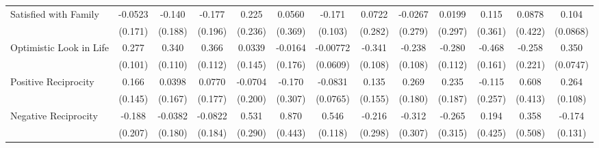 {\begin{tabular}{l*{12}{c}}
\addlinespace
Satisfied with Family&     -0.0523         &      -0.140         &      -0.177         &       0.225         &      0.0560         &      -0.171         &      0.0722         &     -0.0267         &      0.0199         &       0.115         &      0.0878         &       0.104         \\
            &     (0.171)         &     (0.188)         &     (0.196)         &     (0.236)         &     (0.369)         &     (0.103)         &     (0.282)         &     (0.279)         &     (0.297)         &     (0.361)         &     (0.422)         &    (0.0868)         \\
\addlinespace
Optimistic Look in Life&       0.277\sym{**} &       0.340\sym{**} &       0.366\sym{**} &      0.0339         &     -0.0164         &    -0.00772         &      -0.341\sym{**} &      -0.238\sym{*}  &      -0.280\sym{*}  &      -0.468\sym{**} &      -0.258         &       0.350\sym{***}\\
            &     (0.101)         &     (0.110)         &     (0.112)         &     (0.145)         &     (0.176)         &    (0.0609)         &     (0.108)         &     (0.108)         &     (0.112)         &     (0.161)         &     (0.221)         &    (0.0747)         \\
\addlinespace
Positive Reciprocity&       0.166         &      0.0398         &      0.0770         &     -0.0704         &      -0.170         &     -0.0831         &       0.135         &       0.269         &       0.235         &      -0.115         &       0.608         &       0.264\sym{*}  \\
            &     (0.145)         &     (0.167)         &     (0.177)         &     (0.200)         &     (0.307)         &    (0.0765)         &     (0.155)         &     (0.180)         &     (0.187)         &     (0.257)         &     (0.413)         &     (0.108)         \\
\addlinespace
Negative Reciprocity&      -0.188         &     -0.0382         &     -0.0822         &       0.531         &       0.870\sym{*}  &       0.546\sym{***}&      -0.216         &      -0.312         &      -0.265         &       0.194         &       0.358         &      -0.174         \\
            &     (0.207)         &     (0.180)         &     (0.184)         &     (0.290)         &     (0.443)         &     (0.118)         &     (0.298)         &     (0.307)         &     (0.315)         &     (0.425)         &     (0.508)         &     (0.131)         \\
\bottomrule
\end{tabular}
}
